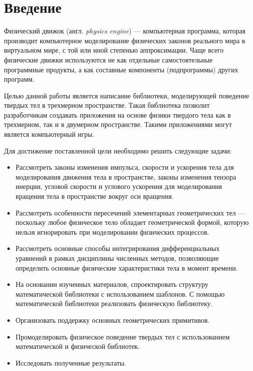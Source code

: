 \chapter*{Введение}	%
Физический движок (англ. \textit{physics engine}) --- компьютерная программа, которая производит
компьютерное моделирование физических законов реального мира в виртуальном мире,
с той или иной степенью аппроксимации. Чаще всего физические движки используются не как отдельные 
самостоятельные программные продукты, а как составные компоненты (подпрограммы) других программ.


Целью данной работы является написание библиотеки, моделирующей поведение твердых тел в трехмерном пространстве. 
Такая библиотека позволит разработчикам создавать приложения на основе физики твердого тела как в трехмерном, так и 
в двумерном пространстве. Такими приложениями могут является компьютерный игры.

Для достижение поставленной цели необходимо решить следующие задачи:%
\begin{itemize}
  \item Рассмотреть законы изменения импульса, скорости и ускорения тела для моделирования
  движения тела в пространстве, законы изменения тензора инерции, угловой скорости и углового ускорения 
  для моделирования вращения тела в пространстве вокруг оси вращения.

  \item Рассмотреть особенности пересечений элементарных геометрических тел --- поскольку любое физическое тело обладает 
  геометрической формой, которую нельзя игнорировать при моделировании физических процессов.

  \item Рассмотреть основные способы интегрирования дифференциальных уравнений в рамках дисциплины численных методов, 
  позволяющие определить основные физические характеристики тела в момент времени.
  
  \item На основании изученных материалов, спроектировать структуру математической библиотеки с использованием шаблонов. 
  С помощью математической библиотеки реализовать физическую библиотеку.
  
  \item Организовать поддержку основных геометрических примитивов.
  
  \item Промоделировать физическое поведение твердых тел с использованием математической и физической библиотек.    
     
  \item Исследовать полученные результаты.
\end{itemize}

